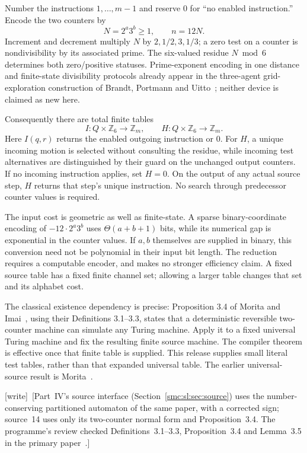 \documentclass[11pt,letterpaper]{article}
\numberwithin{equation}{section}
\theoremstyle{definition}
\theoremstyle{remark}
\newcommand{\Z}{\mathbb Z}
\newcommand{\wtag}{\textup{[write]}}
\begin{document}
Number the instructions $1,\ldots,m-1$ and reserve $0$ for ``no enabled instruction.'' Encode the two counters by
\begin{equation}\label{smc:tm:eq:encoding}
N=2^a3^b\ge1,\qquad n=12N.
\end{equation}
Increment and decrement multiply $N$ by $2,1/2,3,1/3$; a zero test on a counter is nondivisibility by its associated prime. The six-valued residue $N\bmod6$ determines both zero/positive statuses. Prime-exponent encoding in one distance and finite-state divisibility protocols already appear in the three-agent grid-exploration construction of Brandt, Portmann and Uitto~\cite{brandt2020}; neither device is claimed as new here.

Consequently there are total finite tables
\[
I:Q\times\Z_6\longrightarrow\Z_m,
\qquad H:Q\times\Z_6\longrightarrow\Z_m.
\]
Here $I(q,r)$ returns the enabled outgoing instruction or $0$. For $H$, a unique incoming motion is selected without consulting the residue, while incoming test alternatives are distinguished by their guard on the unchanged output counters. If no incoming instruction applies, set $H=0$. On the output of any actual source step, $H$ returns that step's unique instruction. No search through predecessor counter values is required.

The input cost is geometric as well as finite-state. A sparse binary-coordinate encoding of $-12\cdot2^a3^b$ uses $\Theta(a+b+1)$ bits, while its numerical gap is exponential in the counter values. If $a,b$ themselves are supplied in binary, this conversion need not be polynomial in their input bit length. The reduction requires a computable encoder, and makes no stronger efficiency claim. A fixed source table has a fixed finite channel set; allowing a larger table changes that set and its alphabet cost.

The classical existence dependency is precise: Proposition 3.4 of Morita and Imai~\cite{moritaimai}, using their Definitions 3.1--3.3, states that a deterministic reversible two-counter machine can simulate any Turing machine. Apply it to a fixed universal Turing machine and fix the resulting finite source machine. The compiler theorem is effective once that finite table is supplied. This release supplies small literal test tables, rather than that expanded universal table. The earlier universal-source result is Morita~\cite{morita1996}.

\wtag\ [Part~IV's source interface (Section~\ref{smc:sl:sec:source}) uses the number-conserving partitioned automaton of the same paper, with a corrected sign; source~14 uses only its two-counter normal form and Proposition~3.4. The programme's review checked Definitions~3.1--3.3, Proposition~3.4 and Lemma~3.5 in the primary paper~\cite{reviewthreemass}.]
\end{document}
